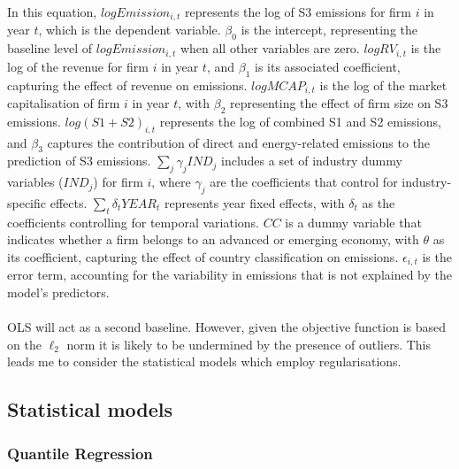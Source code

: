 \documentclass[12pt,twoside]{report}
\begin{document}
In this equation, \( \mathit{logEmission_{i,t}} \) represents the log of S3 emissions for firm \( i \) in year \( t \), which is the dependent variable. \( \beta_0 \) is the intercept, representing the baseline level of \( \mathit{logEmission_{i,t}} \) when all other variables are zero. \( \mathit{logRV_{i,t}} \) is the log of the revenue for firm \( i \) in year \( t \), and \( \beta_1 \) is its associated coefficient, capturing the effect of revenue on emissions. \( \mathit{logMCAP_{i,t}} \) is the log of the market capitalisation of firm \( i \) in year \( t \), with \( \beta_2 \) representing the effect of firm size on S3 emissions. \( \mathit{log(S1+S2)_{i,t}} \) represents the log of combined S1 and S2 emissions, and \( \beta_3 \) captures the contribution of direct and energy-related emissions to the prediction of S3 emissions. \( \sum_j \gamma_j \mathit{IND_j} \) includes a set of industry dummy variables (\( \mathit{IND_j} \)) for firm \( i \), where \( \gamma_j \) are the coefficients that control for industry-specific effects. \( \sum_t \delta_t \mathit{YEAR_t} \) represents year fixed effects, with \( \delta_t \) as the coefficients controlling for temporal variations. \( \mathit{CC} \) is a dummy variable that indicates whether a firm belongs to an advanced or emerging economy, with \( \theta \) as its coefficient, capturing the effect of country classification on emissions. \( \epsilon_{i,t} \) is the error term, accounting for the variability in emissions that is not explained by the model's predictors.
\\\\
OLS will act as a second baseline. However, given the objective function is based on the $\ell_2$ norm it is likely to be undermined by the presence of outliers. This leads me to consider the statistical models which employ regularisations.  

\subsection{Statistical models}

\subsubsection{Quantile Regression}
\end{document}
